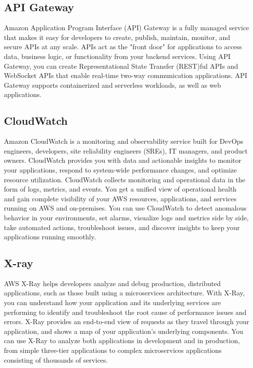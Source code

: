 \subsection{API Gateway
}Amazon Application Program Interface (API) Gateway is a fully managed service that makes it easy for developers to create, publish, maintain, monitor, and secure APIs at any scale. APIs act as the "front door" for applications to access data, business logic, or functionality from your backend services. Using API Gateway, you can create Representational State Transfer (REST)ful APIs and WebSocket APIs that enable real-time two-way communication applications. API Gateway supports containerized and serverless workloads, as well as web applications.\cite{awsapi}
\subsection{CloudWatch
}Amazon CloudWatch is a monitoring and observability service built for DevOps engineers, developers, site reliability engineers (SREs), IT managers, and product owners. CloudWatch provides you with data and actionable insights to monitor your applications, respond to system-wide performance changes, and optimize resource utilization. CloudWatch collects monitoring and operational data in the form of logs, metrics, and events. You get a unified view of operational health and gain complete visibility of your AWS resources, applications, and services running on AWS and on-premises. You can use CloudWatch to detect anomalous behavior in your environments, set alarms, visualize logs and metrics side by side, take automated actions, troubleshoot issues, and discover insights to keep your applications running smoothly.\cite{awscloudwatch}
\subsection{X-ray}
AWS X-Ray helps developers analyze and debug production, distributed applications, such as those built using a microservices architecture. With X-Ray, you can understand how your application and its underlying services are performing to identify and troubleshoot the root cause of performance issues and errors. X-Ray provides an end-to-end view of requests as they travel through your application, and shows a map of your application’s underlying components. You can use X-Ray to analyze both applications in development and in production, from simple three-tier applications to complex microservices applications consisting of thousands of services.\cite{awsxray}

